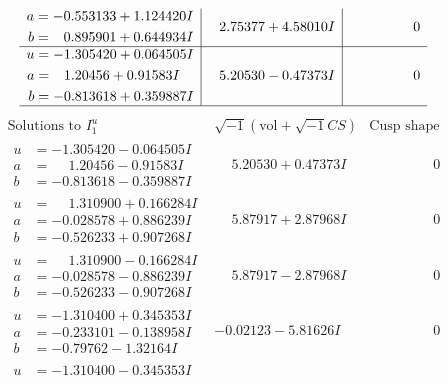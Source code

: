 \documentclass[1p]{elsarticle_modified}
\theoremstyle{definition}
\newcommand{\I}{\sqrt{-1}}
\begin{document}
$$\begin{array}{c|c|c}
\begin{aligned}
a &= -0.553133 + 1.124420 I \\
b &= \phantom{-}0.895901 + 0.644934 I\end{aligned}
 & \phantom{-}2.75377 + 4.58010 I & \phantom{-0.000000 } 0 \\ \hline\begin{aligned}
u &= -1.305420 + 0.064505 I \\
a &= \phantom{-}1.20456 + 0.91583 I \\
b &= -0.813618 + 0.359887 I\end{aligned}
 & \phantom{-}5.20530 - 0.47373 I & \phantom{-0.000000 } 0\\
 \hline 
 \end{array}$$\newpage$$\begin{array}{c|c|c}  
\text{Solutions to }I^u_{1}& \I (\text{vol} + \sqrt{-1}CS) & \text{Cusp shape}\\
 \hline 
\begin{aligned}
u &= -1.305420 - 0.064505 I \\
a &= \phantom{-}1.20456 - 0.91583 I \\
b &= -0.813618 - 0.359887 I\end{aligned}
 & \phantom{-}5.20530 + 0.47373 I & \phantom{-0.000000 } 0 \\ \hline\begin{aligned}
u &= \phantom{-}1.310900 + 0.166284 I \\
a &= -0.028578 + 0.886239 I \\
b &= -0.526233 + 0.907268 I\end{aligned}
 & \phantom{-}5.87917 + 2.87968 I & \phantom{-0.000000 } 0 \\ \hline\begin{aligned}
u &= \phantom{-}1.310900 - 0.166284 I \\
a &= -0.028578 - 0.886239 I \\
b &= -0.526233 - 0.907268 I\end{aligned}
 & \phantom{-}5.87917 - 2.87968 I & \phantom{-0.000000 } 0 \\ \hline\begin{aligned}
u &= -1.310400 + 0.345353 I \\
a &= -0.233101 - 0.138958 I \\
b &= -0.79762 - 1.32164 I\end{aligned}
 & -0.02123 - 5.81626 I & \phantom{-0.000000 } 0 \\ \hline\begin{aligned}
u &= -1.310400 - 0.345353 I \\

\end{aligned}
\end{array}$$
\end{document}

